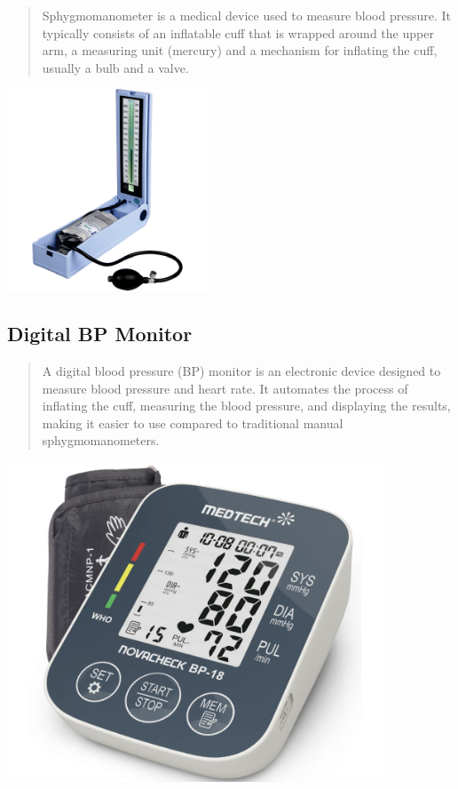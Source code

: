 \documentclass[
  11pt,
  letterpaper,
  DIV=11,
  numbers=noendperiod]{scrreprt}
\begin{document}
\begin{quote}
Sphygmomanometer is a medical device used to measure blood pressure. It
typically consists of an inflatable cuff that is wrapped around the
upper arm, a measuring unit (mercury) and a mechanism for inflating the
cuff, usually a bulb and a valve.
\end{quote}

\begin{center}
\includegraphics[width=0.45\textwidth,height=\textheight]{images/pngegg.png}
\end{center}

\subsection{Digital BP Monitor}\label{digital-bp-monitor}

\begin{quote}
A digital blood pressure (BP) monitor is an electronic device designed
to measure blood pressure and heart rate. It automates the process of
inflating the cuff, measuring the blood pressure, and displaying the
results, making it easier to use compared to traditional manual
sphygmomanometers.
\end{quote}

\begin{center}
\includegraphics[width=4.5in,height=\textheight]{images/clipboard-3151283748.png}
\end{center}
\end{document}
